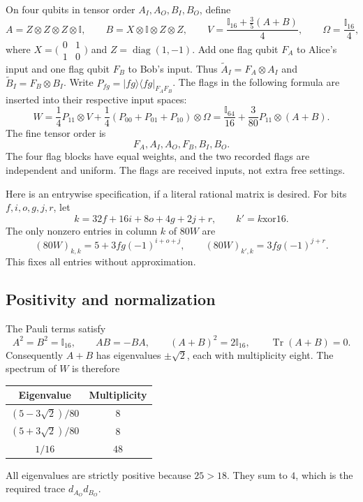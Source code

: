 \documentclass[11pt,letterpaper]{article}
\theoremstyle{remark}\newtheorem{remark}[theorem]{Remark}
\newcommand{\Tr}{\operatorname{Tr}}
\newcommand{\I}{\mathbb I}
\newcommand{\ket}[1]{\lvert#1\rangle}
\newcommand{\bra}[1]{\langle#1\rvert}
\newcommand{\Ain}{\widetilde A_I}
\newcommand{\Bin}{\widetilde B_I}
\begin{document}
On four qubits in tensor order $A_I,A_O,B_I,B_O$, define
\begin{equation}\label{eq:seed}
 A=Z\otimes Z\otimes Z\otimes\I,
 \qquad B=X\otimes\I\otimes Z\otimes Z,
 \qquad V=\frac{\I_{16}+\frac35(A+B)}4,
 \qquad \Omega=\frac{\I_{16}}4,
\end{equation}
where $X=\bigl(\begin{smallmatrix}0&1\\1&0\end{smallmatrix}\bigr)$ and
$Z=\operatorname{diag}(1,-1)$. Add one flag qubit $F_A$ to Alice's input and one flag qubit $F_B$ to Bob's input. Thus $\Ain=F_A\otimes A_I$ and $\Bin=F_B\otimes B_I$. Write $P_{fg}=\ket{fg}\bra{fg}_{F_AF_B}$. The flags in the following formula are inserted into their respective input spaces:
\begin{equation}\label{eq:W}
 \boxed{\displaystyle
 W=\frac14 P_{11}\otimes V
   +\frac14(P_{00}+P_{01}+P_{10})\otimes\Omega
   =\frac{\I_{64}}{16}+\frac{3}{80}P_{11}\otimes(A+B).}
\end{equation}
The fine tensor order is
\begin{equation}\label{eq:basis}
 F_A,A_I,A_O,F_B,B_I,B_O.
\end{equation}
The four flag blocks have equal weights, and the two recorded flags are independent and uniform. The flags are received inputs, not extra free settings.

Here is an entrywise specification, if a literal rational matrix is desired. For bits $f,i,o,g,j,r$, let
\[
 k=32f+16i+8o+4g+2j+r,\qquad k'=k\mathbin{\mathrm{xor}}16.
\]
The only nonzero entries in column $k$ of $80W$ are
\begin{equation}\label{eq:entries}
 (80W)_{k,k}=5+3fg(-1)^{i+o+j},
 \qquad
 (80W)_{k',k}=3fg(-1)^{j+r}.
\end{equation}
This fixes all entries without approximation.

\subsection{Positivity and normalization}

The Pauli terms satisfy
\[
 A^2=B^2=\I_{16},\qquad AB=-BA,
 \qquad (A+B)^2=2\I_{16},\qquad \Tr(A+B)=0.
\]
Consequently $A+B$ has eigenvalues $\pm\sqrt2$, each with multiplicity eight. The spectrum of $W$ is therefore
\begin{center}
\begin{tabular}{@{}cc@{}}
\toprule
Eigenvalue & Multiplicity\\
\midrule
$(5-3\sqrt2)/80$ & $8$\\[2pt]
$(5+3\sqrt2)/80$ & $8$\\[2pt]
$1/16$ & $48$\\
\bottomrule
\end{tabular}
\end{center}
All eigenvalues are strictly positive because $25>18$. They sum to $4$, which is the required trace $d_{A_O}d_{B_O}$.
\end{document}
